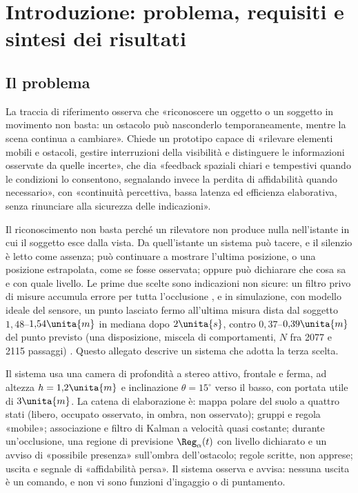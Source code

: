 \section{Introduzione: problema, requisiti e sintesi dei risultati}\label{sec:intro}

\subsection{Il problema}\label{sec:intro-problema}

La traccia di riferimento osserva che «riconoscere un oggetto o un soggetto in movimento non basta: un ostacolo può nasconderlo temporaneamente, mentre la scena continua a cambiare». Chiede un prototipo capace di «rilevare elementi mobili e ostacoli, gestire interruzioni della visibilità e distinguere le informazioni osservate da quelle incerte», che dia «feedback spaziali chiari e tempestivi quando le condizioni lo consentono, segnalando invece la perdita di affidabilità quando necessario», con «continuità percettiva, bassa latenza ed efficienza elaborativa, senza rinunciare alla sicurezza delle indicazioni».

Il riconoscimento non basta perché un rilevatore non produce nulla nell'istante in cui il soggetto esce dalla vista. Da quell'istante un sistema può tacere, e il silenzio è letto come assenza; può continuare a mostrare l'ultima posizione, o una posizione estrapolata, come se fosse osservata; oppure può dichiarare che cosa sa e con quale livello. Le prime due scelte sono indicazioni non sicure: un filtro privo di misure accumula errore per tutta l'occlusione \cite{cao2023}, e in simulazione, con modello ideale del sensore, un punto lasciato fermo all'ultima misura dista dal soggetto $1{,}48$--$1{,}54\unita{m}$ in mediana dopo $2\unita{s}$, contro $0{,}37$--$0{,}39\unita{m}$ del punto previsto (una disposizione, miscela di comportamenti, $N$ fra 2077 e 2115 passaggi) . Questo allegato descrive un sistema che adotta la terza scelta.

Il sistema usa una camera di profondità a stereo attivo, frontale e ferma, ad altezza $h=1{,}2\unita{m}$ e inclinazione $\theta=15^\circ$ verso il basso, con portata utile di $3\unita{m}$. La catena di elaborazione è: mappa polare del suolo a quattro stati (libero, occupato osservato, in ombra, non osservato); gruppi e regola «mobile»; associazione e filtro di Kalman \cite{kalman1960} a velocità quasi costante; durante un'occlusione, una regione di previsione $\Reg_\alpha(t)$ con livello dichiarato e un avviso di «possibile presenza» sull'ombra dell'ostacolo; regole scritte, non apprese; uscita e segnale di «affidabilità persa». Il sistema osserva e avvisa: nessuna uscita è un comando, e non vi sono funzioni d'ingaggio o di puntamento.

